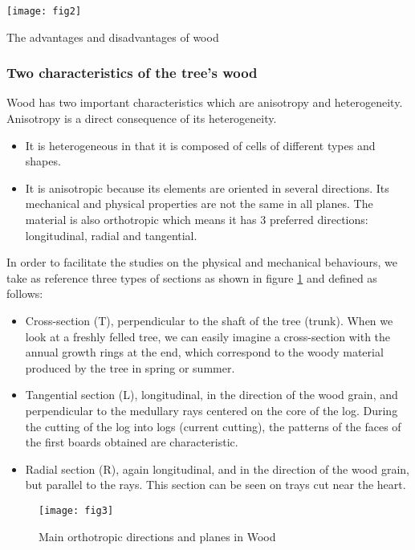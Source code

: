 \begin{table}[htp]
	\centering
	\texttt{[image: fig2]}
	\caption{The advantages and disadvantages of wood}
	\label{fig:fig2}
\end{table}

\subsubsection{Two characteristics of the tree's wood}

Wood has two important characteristics which are anisotropy and heterogeneity. Anisotropy is a direct consequence of its heterogeneity.

\begin{itemize}
	\item It is heterogeneous in that it is composed of cells of different types and shapes. 
	\item It is anisotropic because its elements are oriented in several directions. Its mechanical and physical properties are not the same in all planes. The material is also orthotropic which means it has 3 preferred directions: longitudinal, radial and tangential.
\end{itemize}

In order to facilitate the studies on the physical and mechanical behaviours, we take as reference three types of sections as shown in figure \ref{fig:fig3} and defined as follows:

\begin{itemize}
	\item Cross-section (T), perpendicular to the shaft of the tree (trunk). When we look at a freshly felled tree, we can easily imagine a cross-section with the annual growth rings at the end, which correspond to the woody material produced by the tree in spring or summer.
	\item Tangential section (L), longitudinal, in the direction of the wood grain, and perpendicular to the medullary rays centered on the core of the log. During the cutting of the log into logs (current cutting), the patterns of the faces of the first boards obtained are characteristic.
	\item Radial section (R), again longitudinal, and in the direction of the wood grain, but parallel
	to the rays. This section can be seen on trays cut near the heart.
\end{itemize}


\begin{figure}[htp]
	\centering
	\texttt{[image: fig3]}
	\caption{Main orthotropic directions and planes in Wood}
	\label{fig:fig3}
\end{figure}

